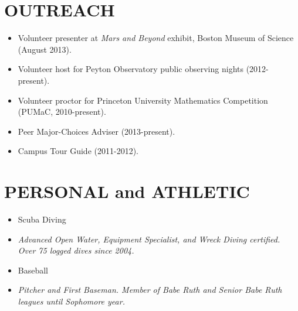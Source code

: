 \documentclass[margin]{res}
\begin{document}
\begin{resume}
\section{OUTREACH}
                  \begin{itemize}
                  \item Volunteer presenter at \textit{Mars and
                    Beyond} exhibit, Boston Museum of Science (August
                    2013).
                  \item Volunteer host for Peyton Observatory public
                    observing nights (2012-present).
                  \item Volunteer proctor for Princeton University
                    Mathematics Competition (PUMaC, 2010-present).
                  \item Peer Major-Choices Adviser (2013-present).
                  \item Campus Tour Guide (2011-2012).
                  \end{itemize} 

\section{PERSONAL and ATHLETIC}
\begin{itemize}
\item Scuba Diving
\item[] \textit{Advanced Open Water, Equipment Specialist, and Wreck Diving certified. Over 75 logged dives since 2004.}
\item Baseball
\item[] \textit{Pitcher and First Baseman. Member of Babe Ruth and Senior Babe Ruth leagues until Sophomore year.}
\end{itemize}
\end{resume} 
\end{document}
